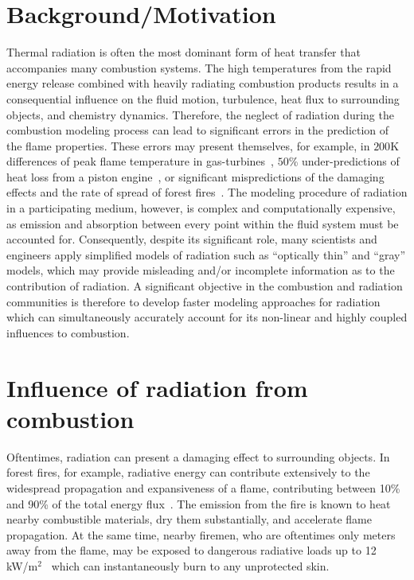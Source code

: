 \section{Background/Motivation}
Thermal radiation is often the most dominant form of heat transfer that accompanies many combustion systems. The high temperatures from the rapid energy release combined with heavily radiating combustion products results in a consequential influence on the fluid motion, turbulence, heat flux to surrounding objects, and chemistry dynamics. 
Therefore, the neglect of radiation during the combustion modeling process can lead to significant errors in the prediction of the flame properties. These errors may present themselves, for example, in $200$K differences of peak flame temperature in gas-turbines~\cite{Gamil2020AssessmentChamber}, $50$\% under-predictions of heat loss from a piston engine~\cite{Modest2016RadiativeSystems}, or significant mispredictions of the damaging effects and the rate of spread of forest fires~\cite{Valendik2008EffectEnvironment}. 
The modeling procedure of radiation in a participating medium, however, is complex and computationally expensive, as emission and absorption between every point within the fluid system must be accounted for. Consequently, despite its significant role, many scientists and engineers apply simplified models of radiation such as “optically thin” and “gray” models, which may provide misleading and/or incomplete information as to the contribution of radiation. 
A significant objective in the combustion and radiation communities is therefore to develop faster modeling approaches for radiation which can simultaneously accurately account for its non-linear and highly coupled influences to combustion.

\section{Influence of radiation from combustion}

Oftentimes, radiation can present a damaging effect to surrounding objects.
In forest fires, for example, radiative energy can contribute extensively to the widespread propagation and expansiveness of a flame, contributing between 10\% and 90\% of the total energy flux~\cite{Valendik2008EffectEnvironment}. 
The emission from the fire is known to heat nearby combustible materials, dry them substantially, and accelerate flame propagation. At the same time, nearby firemen, who are oftentimes only meters away from the flame, may be exposed to dangerous radiative loads up to 12 kW/m$^2$~\cite{Valendik2008EffectEnvironment} which can instantaneously burn to any unprotected skin.


